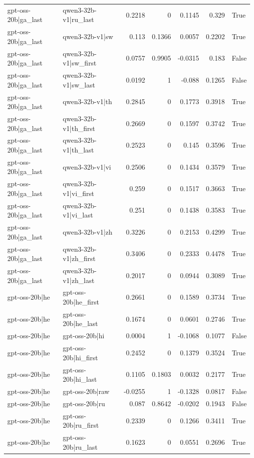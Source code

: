 \begin{table}
\begin{tabular}{l l r r r r l}
gpt-oss-20b|ga_last & qwen3-32b-v1|ru_last & 0.2218 & 0 & 0.1145 & 0.329 & True \\
gpt-oss-20b|ga_last & qwen3-32b-v1|sw & 0.113 & 0.1366 & 0.0057 & 0.2202 & True \\
gpt-oss-20b|ga_last & qwen3-32b-v1|sw_first & 0.0757 & 0.9905 & -0.0315 & 0.183 & False \\
gpt-oss-20b|ga_last & qwen3-32b-v1|sw_last & 0.0192 & 1 & -0.088 & 0.1265 & False \\
gpt-oss-20b|ga_last & qwen3-32b-v1|th & 0.2845 & 0 & 0.1773 & 0.3918 & True \\
gpt-oss-20b|ga_last & qwen3-32b-v1|th_first & 0.2669 & 0 & 0.1597 & 0.3742 & True \\
gpt-oss-20b|ga_last & qwen3-32b-v1|th_last & 0.2523 & 0 & 0.145 & 0.3596 & True \\
gpt-oss-20b|ga_last & qwen3-32b-v1|vi & 0.2506 & 0 & 0.1434 & 0.3579 & True \\
gpt-oss-20b|ga_last & qwen3-32b-v1|vi_first & 0.259 & 0 & 0.1517 & 0.3663 & True \\
gpt-oss-20b|ga_last & qwen3-32b-v1|vi_last & 0.251 & 0 & 0.1438 & 0.3583 & True \\
gpt-oss-20b|ga_last & qwen3-32b-v1|zh & 0.3226 & 0 & 0.2153 & 0.4299 & True \\
gpt-oss-20b|ga_last & qwen3-32b-v1|zh_first & 0.3406 & 0 & 0.2333 & 0.4478 & True \\
gpt-oss-20b|ga_last & qwen3-32b-v1|zh_last & 0.2017 & 0 & 0.0944 & 0.3089 & True \\
gpt-oss-20b|he & gpt-oss-20b|he_first & 0.2661 & 0 & 0.1589 & 0.3734 & True \\
gpt-oss-20b|he & gpt-oss-20b|he_last & 0.1674 & 0 & 0.0601 & 0.2746 & True \\
gpt-oss-20b|he & gpt-oss-20b|hi & 0.0004 & 1 & -0.1068 & 0.1077 & False \\
gpt-oss-20b|he & gpt-oss-20b|hi_first & 0.2452 & 0 & 0.1379 & 0.3524 & True \\
gpt-oss-20b|he & gpt-oss-20b|hi_last & 0.1105 & 0.1803 & 0.0032 & 0.2177 & True \\
gpt-oss-20b|he & gpt-oss-20b|raw & -0.0255 & 1 & -0.1328 & 0.0817 & False \\
gpt-oss-20b|he & gpt-oss-20b|ru & 0.087 & 0.8642 & -0.0202 & 0.1943 & False \\
gpt-oss-20b|he & gpt-oss-20b|ru_first & 0.2339 & 0 & 0.1266 & 0.3411 & True \\
gpt-oss-20b|he & gpt-oss-20b|ru_last & 0.1623 & 0 & 0.0551 & 0.2696 & True \\

\end{tabular}
\end{table}
